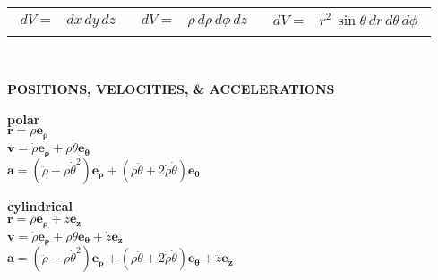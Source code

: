 \documentclass[letterpaper,landscape,10pt]{article}
\newenvironment{mydescription}
{\begin{description}
	\setlength{\itemsep}{0pt}
	\setlength{\parskip}{0pt}
	\setlength{\parsep}{-1pt}}
{\end{description}}
\begin{document}
{\begin{multicols}{3}
\begin{center}
\begin{tabular}{ @{}c@{} !{\color{black}\vline} c !{\color{black}\vline} @{}c@{} }
			\hline

			\parbox[t]{.290\columnwidth}{\vspace{-10pt}
				\begin{equation*}\begin{split}
					dV =& dx \, dy \, dz
				\end{split}\end{equation*} } &

			\parbox[t]{.295\columnwidth}{\vspace{-10pt}
				\begin{equation*}\begin{split}
					dV =& \rho \, d\rho \, d\phi \, dz
				\end{split}\end{equation*} } &

			\parbox[t]{.335\columnwidth}{\vspace{-10pt}
				\begin{equation*}\begin{split}
					dV =& r^2 \, \sin\theta \, dr \, d\theta \, d\phi
				\end{split}\end{equation*} } \\
		\end{tabular}\\
	\end{center}

	\begin{center}
		\textbf{POSITIONS, VELOCITIES, \& ACCELERATIONS}\\
	\end{center}
	\begin{mydescription}
	  \item[\textbf{polar}] \ \\
		$\bm{\bm{r}} = \rho\bm{\bm{e_\rho}}$\\
		$\bm{\bm{v}} = \dot{\rho}\bm{\bm{e_\rho}} + \rho\dot\theta\bm{\bm{e_\theta}}$\\
		$\bm{\bm{a}} = \left(\ddot{\rho}-\rho\dot\theta^2\right)\bm{\bm{e_\rho}} + 
		\left( \rho\ddot\theta+2\dot{\rho}\dot\theta\right)\bm{\bm{e_\theta}}$\\
	\item[\textbf{cylindrical}] \ \\
		$\bm{\bm{r}} = \rho\bm{\bm{e_\rho}} + z\bm{\bm{e_z}}$\\
		$\bm{\bm{v}} = \dot{\rho}\bm{\bm{e_\rho}} + \rho\dot\theta\bm{\bm{e_\theta}} + \dot{z}\bm{\bm{e_z}}$\\
		$\bm{\bm{a}} = \left(\ddot{\rho}-\rho\dot\theta^2\right)\bm{\bm{e_\rho}} + 
		\left( \rho\ddot\theta+2\dot{\rho}\dot\theta\right)\bm{\bm{e_\theta}} +
		\ddot{z}\bm{\bm{e_z}}$


\end{mydescription}
\end{multicols}}
\end{document}
